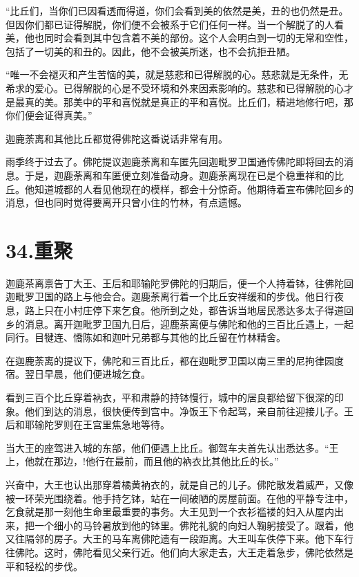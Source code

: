 \documentclass[12pt,twoside,openany]{book}
\begin{document}
“比丘们，当你们已因看透而得道，你们会看到美的依然是美，丑的也仍然是丑。但因你们都已证得解脱，你们便不会被系于它们任何一样。当一个解脱了的人看美，他也同时会看到其中包含着不美的部份。这个人会明白到一切的无常和空性，包括了一切美的和丑的。因此，他不会被美所迷，也不会抗拒丑陋。

“唯一不会褪灭和产生苦恼的美，就是慈悲和已得解脱的心。慈悲就是无条件，无希求的爱心。已得解脱的心是不受环境和外来因素影响的。慈悲和已得解脱的心才是最真的美。那美中的平和喜悦就是真正的平和喜悦。比丘们，精进地修行吧，那你们便会证得真美。”

迦鹿荼离和其他比丘都觉得佛陀这番说话非常有用。

雨季终于过去了。佛陀提议迦鹿荼离和车匿先回迦毗罗卫国通传佛陀即将回去的消息。于是，迦鹿荼离和车匿便立刻准备动身。迦鹿荼离现在已是个稳重祥和的比丘。他知道城都的人看见他现在的模样，都会十分惊奇。他期待着宣布佛陀回乡的消息，但也同时觉得要离开只曾小住的竹林，有点遗憾。


\chapter{34.重聚}\label{ch34}

迦鹿茶离禀告丁大王、王后和耶输陀罗佛陀的归期后，便一个人持着钵，往佛陀回迦毗罗卫国的路上与他会合。迦鹿荼离行着一个比丘安祥缓和的步伐。他日行夜息，路上只在小村庄停下来乞食。他所到之处，都告诉当地居民悉达多太子得道回乡的消息。离开迦毗罗卫国九日后，迎鹿荼离便与佛陀和他的三百比丘遇上，一起同行。目犍连、憍陈如和迦叶兄弟都与其他的比丘留在竹林精舍。

在迦鹿荼离的提议下，佛陀和三百比丘，都在迦毗罗卫国以南三里的尼拘律园度宿。翌日早晨，他们便进城乞食。

看到三百个比丘穿着衲衣，平和肃静的持钵慢行，城中的居良都给留下很深的印象。他们到达的消息，很快便传到宫中。净饭王下令起驾，亲自前往迎接儿子。王后和耶输陀罗则在王宫里焦急地等待。

当大王的座驾进入城的东部，他们便遇上比丘。御驾车夫首先认出悉达多。“王上，他就在那边，!他行在最前，而且他的衲衣比其他比丘的长。”

兴奋中，大王也认出那穿着橘黄衲衣的，就是自己的儿子。佛陀散发着威严，又像被一环荣光围绕着。他手持乞钵，站在一间破陋的房屋前面。在他的平静专注中，乞食就是那一刻他生命里最重要的事务。大王见到一个衣衫褴褛的妇入从屋内出来，把一个细小的马铃暑放到他的钵里。佛陀礼貌的向妇人鞠躬接受了。跟着，他又往隔邻的房子。大王的马车离佛陀遗有一段距离。大王叫车佚停下来。他下车行往佛陀。这时，佛陀看见父亲行近。他们向大家走去，大王走着急步，佛陀依然是平和轻松的步伐。
\end{document}
